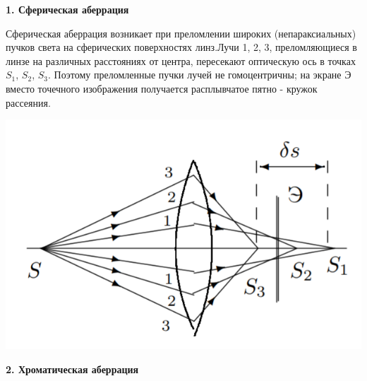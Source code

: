 \documentclass[a4paper,12pt]{report}
\begin{document}
\noindent\textbf{1. Сферическая аберрация}

Сферическая аберрация возникает при преломлении широких (непараксиальных) пучков света на сферических поверхностях линз.Лучи 1, 2, 3, преломляющиеся в линзе на различных расстояниях от центра, пересекают оптическую ось в точках $S_{1}$, $S_{2}$, $S_{3}$. Поэтому преломленные пучки лучей не гомоцентричны; на экране Э вместо точечного изображения получается расплывчатое пятно - кружок рассеяния.
\begin{center}
    \includegraphics[scale = 0.5]{pic5.PNG}
\end{center}

\noindent\textbf{2. Хроматическая аберрация}
\end{document}
